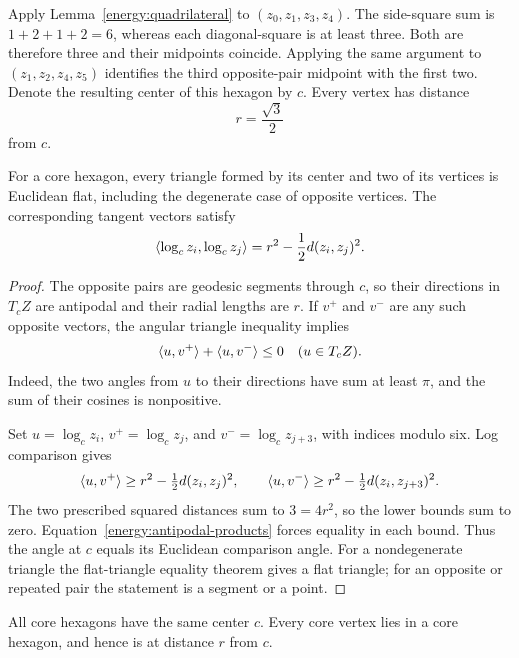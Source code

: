 Apply Lemma~\ref{energy:quadrilateral} to
$(z_0,z_1,z_3,z_4)$.  The side-square sum is $1+2+1+2=6$, whereas each
diagonal-square is at least three.  Both are therefore three and
their midpoints coincide.  Applying the same argument to
$(z_1,z_2,z_4,z_5)$ identifies the third opposite-pair midpoint with
the first two.  Denote the resulting center of this hexagon by $c$.
Every vertex has distance
\begin{equation}\label{energy:radius}
 r=\frac{\sqrt3}{2}
\end{equation}
from $c$.

\begin{lemma}\label{energy:hexagon-flatness}
For a core hexagon, every triangle formed by its center and two of
its vertices is Euclidean flat, including the degenerate case of
opposite vertices.  The corresponding tangent vectors satisfy
\begin{equation}\label{energy:hexagon-products}
 \langle \log_c z_i,\log_c z_j\rangle
 =r^2-\frac12d(z_i,z_j)^2.
\end{equation}
\end{lemma}

\begin{proof}
The opposite pairs are geodesic segments through $c$, so their
directions in $T_cZ$ are antipodal and their radial lengths are $r$.
If $v^+$ and $v^-$ are any such opposite vectors, the angular
triangle inequality implies
\begin{equation}\label{energy:antipodal-products}
 \langle u,v^+\rangle+\langle u,v^-\rangle\le0
 \quad(u\in T_cZ).
\end{equation}
Indeed, the two angles from $u$ to their directions have sum at
least $\pi$, and the sum of their cosines is nonpositive.

Set $u=\log_c z_i$, $v^+=\log_c z_j$, and
$v^-=\log_c z_{j+3}$, with indices modulo six.  Log comparison gives
\[
 \langle u,v^+\rangle\ge r^2-\tfrac12d(z_i,z_j)^2,
 \qquad
 \langle u,v^-\rangle\ge r^2-\tfrac12d(z_i,z_{j+3})^2.
\]
The two prescribed squared distances sum to $3=4r^2$, so the lower
bounds sum to zero.  Equation~\eqref{energy:antipodal-products}
forces equality in each bound.  Thus the angle at $c$ equals its
Euclidean comparison angle.  For a nondegenerate triangle the
flat-triangle equality theorem gives a flat triangle; for an
opposite or repeated pair the statement is a segment or a point.
\end{proof}

\begin{lemma}\label{energy:common-center}
All core hexagons have the same center $c$.  Every core vertex lies
in a core hexagon, and hence is at distance $r$ from $c$.
\end{lemma}

